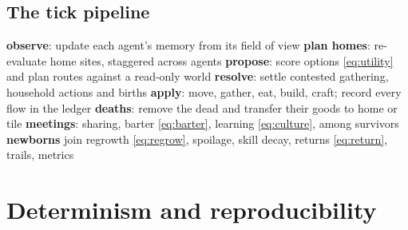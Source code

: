 \documentclass[11pt]{article}
\theoremstyle{definition}
\newcommand{\1}{\mathbf{1}}
\begin{document}
\subsection{The tick pipeline}

\begin{algorithm}[h]
\caption{One tick of \texttt{Simulation::step}}
\begin{algorithmic}[1]
\State \textbf{observe}: update each agent's memory from its field of view
\State \textbf{plan homes}: re-evaluate home sites, staggered across agents
\State \textbf{propose}: score options \eqref{eq:utility} and plan routes against a read-only world
\State \textbf{resolve}: settle contested gathering, household actions and births
\State \textbf{apply}: move, gather, eat, build, craft; record every flow in the ledger
\State \textbf{deaths}: remove the dead and transfer their goods to home or tile
\State \textbf{meetings}: sharing, barter \eqref{eq:barter}, learning \eqref{eq:culture}, among survivors
\State \textbf{newborns} join
 regrowth \eqref{eq:regrow}, spoilage, skill decay, returns \eqref{eq:return}, trails, metrics \EndIf
\end{algorithmic}
\end{algorithm}

\section{Determinism and reproducibility}\label{sec:repro}
\end{document}
